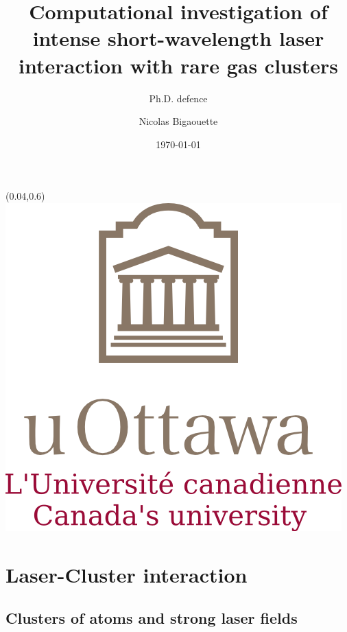 \documentclass{beamer}
\title{Computational investigation of intense short-wavelength laser interaction with rare gas clusters}
\subtitle{Ph.D. defence}
\author{Nicolas Bigaouette}
\date[December 2013]{\today}
\institute{Computational Nanophotonics Group
\newline
Physics Department -- University of Ottawa}
\begin{document}
\begin{frame}{}
\titlepage
\begin{textblock}{0}(0.04,0.6)
\includegraphics[width=0.22\paperwidth]{figures/UofO}
\end{textblock}
\end{frame}

\begin{frame}
\tableofcontents
\end{frame}


\section{Laser-Cluster interaction}

\subsection{Clusters of atoms and strong laser fields}
\begin{frame}{}
\end{frame}
\end{document}

